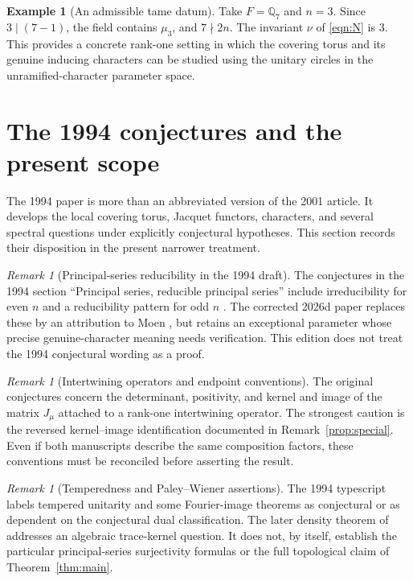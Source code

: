 \documentclass[12pt,letterpaper]{article}
\theoremstyle{definition}
\newtheorem{example}[theorem]{Example}
\theoremstyle{remark}
\newtheorem{remark}[theorem]{Remark}
\begin{document}
\begin{example}[An admissible tame datum]\label{ex:tame}
Take $F=\mathbb Q_7$ and $n=3$.  Since $3\mid(7-1)$, the field
contains $\mu_3$, and $7\nmid 2n$.  The invariant $\nu$ of
\eqref{eqn:N} is $3$.  This provides a concrete rank-one setting
in which the covering torus and its genuine inducing characters
can be studied using the unitary circles in the unramified-character
parameter space.
\end{example}

\section{The 1994 conjectures and the present scope}\label{sec:conjectures}
The 1994 paper is more than an abbreviated version of the 2001 article.
It develops the local covering torus, Jacquet functors, characters,
and several spectral questions under explicitly conjectural hypotheses.
This section records their disposition in the present narrower treatment.

\begin{remark}[Principal-series reducibility in the 1994 draft]
The conjectures in the 1994 section ``Principal series, reducible
principal series'' include irreducibility for even $n$ and a reducibility
pattern for odd $n$ \cite{Jo94}.  The corrected 2026d paper replaces
these by an attribution to Moen \cite{Mo88}, but retains an exceptional
parameter whose precise genuine-character meaning needs verification.
This edition does not treat the 1994 conjectural wording as a proof.
\end{remark}

\begin{remark}[Intertwining operators and endpoint conventions]
The original conjectures concern the determinant, positivity, and
kernel and image of the matrix $J_\mu$ attached to a rank-one
intertwining operator.  The strongest caution is the reversed
kernel--image identification documented in Remark~\ref{prop:special}.
Even if both manuscripts describe the same composition factors,
these conventions must be reconciled before asserting the result.
\end{remark}

\begin{remark}[Temperedness and Paley--Wiener assertions]
The 1994 typescript labels tempered unitarity and some Fourier-image
theorems as conjectural or as dependent on the conjectural dual
classification.  The later density theorem of
\cite[Theorem~5.8.10]{Li12} addresses an algebraic trace-kernel
question.  It does not, by itself, establish the particular
principal-series surjectivity formulas or the full topological
claim of Theorem~\ref{thm:main}.
\end{remark}
\end{document}
